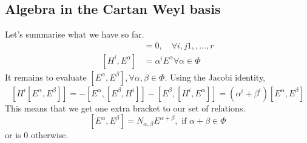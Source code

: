 \subsection{Algebra in the Cartan Weyl basis} 
Let's summarise what we have so far. 
\begin{align*}
	[ H ^ i , H ^ j ] &=  0 , \quad \forall i , j   1, , \dots, r  \\ 
	[ H ^ i , E ^ \alpha ] & = \alpha ^ i E ^ \alpha \forall \alpha \in \Phi 
\end{align*}
It remains to evaluate $ [ E ^ \alpha , E ^ \beta ] , \forall \alpha, \beta \in \Phi$. 
Using the Jacobi identity, 
 \[
 [ H ^ i [ E ^ \alpha, E ^ \beta ] ] =  - [ E ^ \alpha , [ E ^ \beta , H ^ i ]] - [ E ^ \beta , 
 [ H ^ i , E ^ \alpha ] ]  = ( \alpha ^ i + \beta ^ i ) [ E ^ \alpha , E ^ \beta ] 
\] 
This means that we get one extra bracket to our set of relations. 
\[
 [ E ^ \alpha , E ^ \beta ] = N_{ \alpha, \beta  } E ^{ \alpha + \beta }, \text{ if } 
  \alpha + \beta  \in \Phi 
\] or is $ 0 $ otherwise.
\pagebreak 

